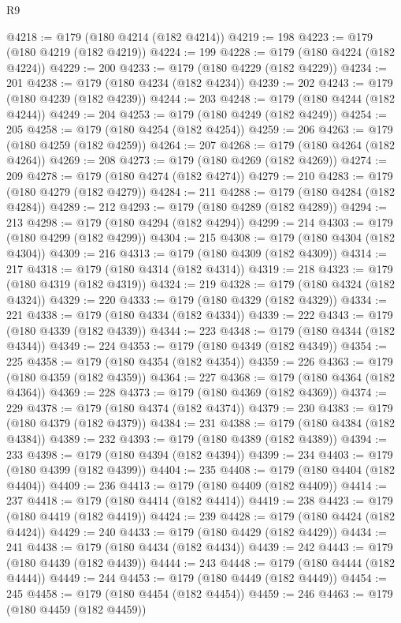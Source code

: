 \begin{lexlean}{R9}
\begin{coremodule}
@4218 := @179 (@180 @4214 (@182 @4214))
@4219 := 198
@4223 := @179 (@180 @4219 (@182 @4219))
@4224 := 199
@4228 := @179 (@180 @4224 (@182 @4224))
@4229 := 200
@4233 := @179 (@180 @4229 (@182 @4229))
@4234 := 201
@4238 := @179 (@180 @4234 (@182 @4234))
@4239 := 202
@4243 := @179 (@180 @4239 (@182 @4239))
@4244 := 203
@4248 := @179 (@180 @4244 (@182 @4244))
@4249 := 204
@4253 := @179 (@180 @4249 (@182 @4249))
@4254 := 205
@4258 := @179 (@180 @4254 (@182 @4254))
@4259 := 206
@4263 := @179 (@180 @4259 (@182 @4259))
@4264 := 207
@4268 := @179 (@180 @4264 (@182 @4264))
@4269 := 208
@4273 := @179 (@180 @4269 (@182 @4269))
@4274 := 209
@4278 := @179 (@180 @4274 (@182 @4274))
@4279 := 210
@4283 := @179 (@180 @4279 (@182 @4279))
@4284 := 211
@4288 := @179 (@180 @4284 (@182 @4284))
@4289 := 212
@4293 := @179 (@180 @4289 (@182 @4289))
@4294 := 213
@4298 := @179 (@180 @4294 (@182 @4294))
@4299 := 214
@4303 := @179 (@180 @4299 (@182 @4299))
@4304 := 215
@4308 := @179 (@180 @4304 (@182 @4304))
@4309 := 216
@4313 := @179 (@180 @4309 (@182 @4309))
@4314 := 217
@4318 := @179 (@180 @4314 (@182 @4314))
@4319 := 218
@4323 := @179 (@180 @4319 (@182 @4319))
@4324 := 219
@4328 := @179 (@180 @4324 (@182 @4324))
@4329 := 220
@4333 := @179 (@180 @4329 (@182 @4329))
@4334 := 221
@4338 := @179 (@180 @4334 (@182 @4334))
@4339 := 222
@4343 := @179 (@180 @4339 (@182 @4339))
@4344 := 223
@4348 := @179 (@180 @4344 (@182 @4344))
@4349 := 224
@4353 := @179 (@180 @4349 (@182 @4349))
@4354 := 225
@4358 := @179 (@180 @4354 (@182 @4354))
@4359 := 226
@4363 := @179 (@180 @4359 (@182 @4359))
@4364 := 227
@4368 := @179 (@180 @4364 (@182 @4364))
@4369 := 228
@4373 := @179 (@180 @4369 (@182 @4369))
@4374 := 229
@4378 := @179 (@180 @4374 (@182 @4374))
@4379 := 230
@4383 := @179 (@180 @4379 (@182 @4379))
@4384 := 231
@4388 := @179 (@180 @4384 (@182 @4384))
@4389 := 232
@4393 := @179 (@180 @4389 (@182 @4389))
@4394 := 233
@4398 := @179 (@180 @4394 (@182 @4394))
@4399 := 234
@4403 := @179 (@180 @4399 (@182 @4399))
@4404 := 235
@4408 := @179 (@180 @4404 (@182 @4404))
@4409 := 236
@4413 := @179 (@180 @4409 (@182 @4409))
@4414 := 237
@4418 := @179 (@180 @4414 (@182 @4414))
@4419 := 238
@4423 := @179 (@180 @4419 (@182 @4419))
@4424 := 239
@4428 := @179 (@180 @4424 (@182 @4424))
@4429 := 240
@4433 := @179 (@180 @4429 (@182 @4429))
@4434 := 241
@4438 := @179 (@180 @4434 (@182 @4434))
@4439 := 242
@4443 := @179 (@180 @4439 (@182 @4439))
@4444 := 243
@4448 := @179 (@180 @4444 (@182 @4444))
@4449 := 244
@4453 := @179 (@180 @4449 (@182 @4449))
@4454 := 245
@4458 := @179 (@180 @4454 (@182 @4454))
@4459 := 246
@4463 := @179 (@180 @4459 (@182 @4459))

\end{coremodule}
\end{lexlean}
